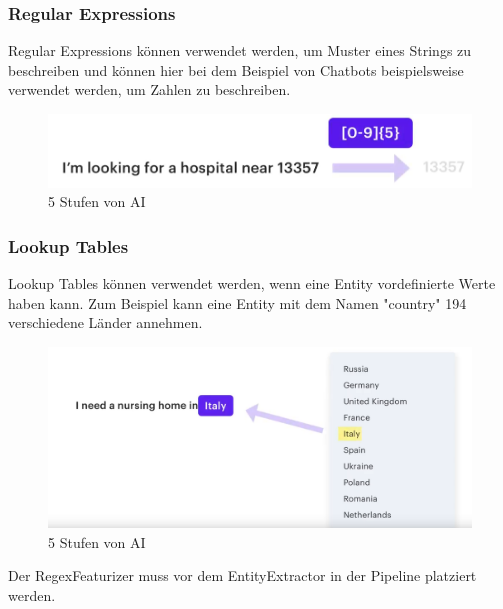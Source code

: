 \subsubsection{Regular Expressions}

Regular Expressions können verwendet werden, um Muster eines Strings zu beschreiben und können hier bei dem Beispiel von Chatbots beispielsweise verwendet werden, um Zahlen zu beschreiben.\cite{rasaMasterclassRegexFeaturizer, pipelineComponentsYoutube, regexFeaturizerCrf}

\begin{figure}[hbt!]
  \centering
  \includegraphics[scale=0.25]{pics/regular-expression-example}
  \caption{5 Stufen von AI~\cite{pipelineComponentsYoutube}}
  \label{fig:Regular Expression Beispiel}
\end{figure}

\subsubsection{Lookup Tables}

Lookup Tables können verwendet werden, wenn eine Entity vordefinierte Werte haben kann.
Zum Beispiel kann eine Entity mit dem Namen "country" 194 verschiedene Länder annehmen.\cite{rasaMasterclassRegexFeaturizer, pipelineComponentsYoutube, regexFeaturizerCrf}

\begin{figure}[hbt!]
  \centering
  \includegraphics[scale=0.25]{pics/lookup-table-example}
  \caption{5 Stufen von AI~\cite{pipelineComponentsYoutube}}
  \label{fig:Lookup Table Beispiel}
\end{figure}

Der RegexFeaturizer muss vor dem EntityExtractor in der Pipeline platziert werden.\cite{rasaMasterclassRegexFeaturizer, pipelineComponentsYoutube, regexFeaturizerCrf}

